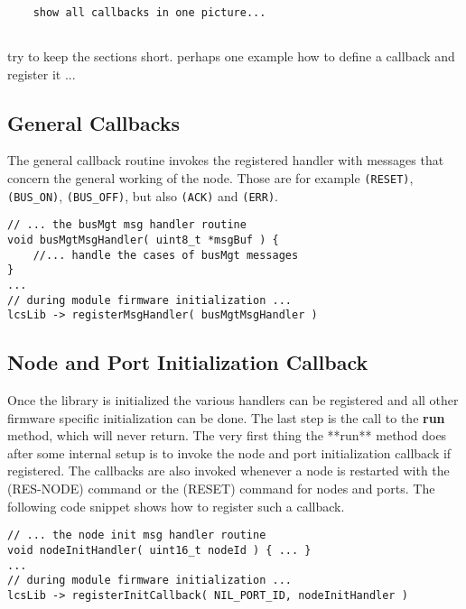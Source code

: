 \lstset{language=c++, style=codesnippetstyle}
\begin{lstlisting}
   
    show all callbacks in one picture...
    
\end{lstlisting}

try to keep the sections short. perhaps one example how to define a callback and register it ...

\subsection{General Callbacks}

The general callback routine invokes the registered handler with messages that concern the general working of the node. Those are for example \texttt{(RESET)}, \texttt{(BUS\_ON)}, \texttt{(BUS\_OFF)}, but also \texttt{(ACK)} and \texttt{(ERR)}.

\lstset{style=codesnippetstyle}
\begin{lstlisting}
// ... the busMgt msg handler routine
void busMgtMsgHandler( uint8_t *msgBuf ) {
	//... handle the cases of busMgt messages
}
...
// during module firmware initialization ...
lcsLib -> registerMsgHandler( busMgtMsgHandler )
\end{lstlisting}

\subsection{Node and Port Initialization Callback}

Once the library is initialized the various handlers can be registered and all other firmware specific initialization can be done. The last step is the call to the \textbf{run} method, which will never return. The very first thing the **run** method does after some internal setup is to invoke the node and port initialization callback if registered. The callbacks are also invoked whenever a node is restarted with the (RES-NODE) command or the (RESET) command for nodes and ports. The following code snippet shows how to register such a callback.

\lstset{style=codesnippetstyle}
\begin{lstlisting}
// ... the node init msg handler routine
void nodeInitHandler( uint16_t nodeId ) { ... }
...
// during module firmware initialization ...
lcsLib -> registerInitCallback( NIL_PORT_ID, nodeInitHandler )
\end{lstlisting}

